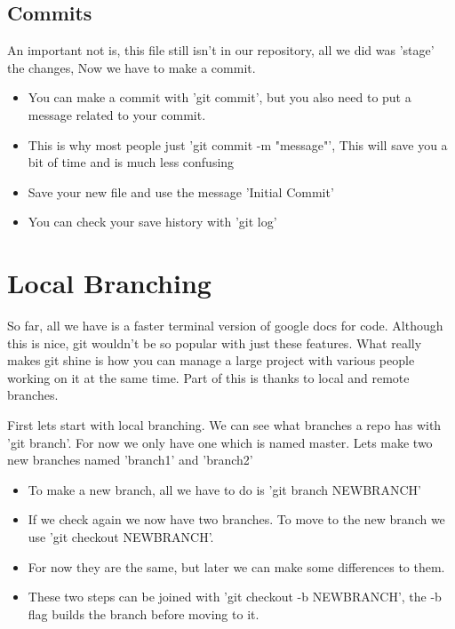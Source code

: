 \documentclass{beamer}
\begin{document}
\subsection{Commits}
\begin{frame}
An important not is, this file still isn't in our repository, all we did was 
'stage' the changes, Now we have to make a commit.
\begin{itemize}
\item You can make a commit with 'git commit', but you also need to 
put a message related to your commit.
\item This is why most people just 'git commit -m "message"', This will save 
you a bit of time and is much less confusing
\item Save your new file and use the message 'Initial Commit'
\item You can check your save history with 'git log'
\end{itemize}
\end{frame}

\section{Local Branching}
\begin{frame}
So far, all we have is a faster terminal version of google docs for 
code. Although this is nice, git wouldn't be so popular with just these 
features.
\newline
\newline
What really makes git shine is how you can manage a large project with various 
people working on it at the same time.
\newline
\newline
Part of this is thanks to local and remote branches.
\end{frame}

\begin{frame}
First lets start with local branching. We can see what branches a repo has with 
'git branch'. For now we only have one which is named master. Lets make two new 
branches named 'branch1' and 'branch2'
\begin{itemize}
 \item To make a new branch, all we have to do is 'git branch NEWBRANCH'
 \item If we check again we now have two branches. To move to the new branch we 
use 'git checkout NEWBRANCH'.
 \item  For now they are the same, but later we can make some differences to 
them.
 \item These two steps can be joined with 'git checkout -b NEWBRANCH', the -b 
flag builds the branch before moving to it.
\end{itemize}
\end{frame}
\end{document}
